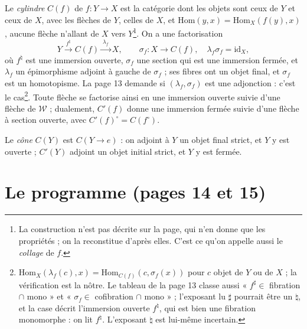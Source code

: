 \documentclass[11pt,a4paper]{article}
\begin{document}
Le \emph{cylindre} $C(f)$ de $f : Y \to X$ est la catégorie dont les objets
sont ceux de $Y$ et ceux de $X$, avec les flèches de $Y$, celles de $X$, et
$\mathrm{Hom}(y, x) = \mathrm{Hom}_{X}(f(y), x)$, aucune flèche n'allant de $X$
vers $Y$\footnote{La construction n'est pas décrite sur la page, qui n'en donne
que les propriétés ; on la reconstitue d'après elles. C'est ce qu'on appelle
aussi le \emph{collage} de $f$.}. On a une factorisation
\[
Y \xrightarrow{\ f^{\natural}\ } C(f) \xrightarrow{\ \lambda_{f}\ } X ,
\qquad \sigma_{f} : X \to C(f), \quad \lambda_{f}\sigma_{f} = \mathrm{id}_{X},
\]
où $f^{\natural}$ est une immersion ouverte, $\sigma_{f}$ une section qui est
une immersion fermée, et $\lambda_{f}$ un épimorphisme adjoint à gauche de
$\sigma_{f}$ ; ses fibres ont un objet final, et $\sigma_{f}$ est un
homotopisme. La page 13 demande si $(\lambda_{f}, \sigma_{f})$ est une
adjonction : c'est le cas\footnote{$\mathrm{Hom}_{X}(\lambda_{f}(c), x) =
\mathrm{Hom}_{C(f)}(c, \sigma_{f}(x))$ pour $c$ objet de $Y$ ou de $X$ ; la
vérification est la nôtre. Le tableau de la page 13 classe aussi
« $f^{\sharp} \in$ fibration $\cap$ mono » et « $\sigma_{f} \in$
cofibration $\cap$ mono » ; l'exposant lu $\sharp$ pourrait être un
$\natural$, et la case décrit l'immersion ouverte $f^{\natural}$, qui est bien
une fibration monomorphe : on lit $f^{\natural}$. L'exposant $\natural$ est
lui-même incertain.}. Toute flèche se factorise ainsi en une immersion ouverte
suivie d'une flèche de $\mathcal{W}$ ; dualement, $C'(f)$ donne une immersion
fermée suivie d'une flèche à section ouverte, avec
$C'(f)^{\circ} = C(f^{\circ})$.

Le \emph{cône} $C(Y)$ est $C(Y \to e)$ : on adjoint à $Y$ un objet final strict,
et $Y$ y est ouverte ; $C'(Y)$ adjoint un objet initial strict, et $Y$ y est
fermée.

\section*{Le programme (pages 14 et 15)}
\end{document}
